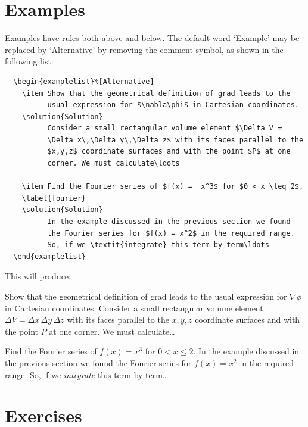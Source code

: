 \section{Examples}
\label{examples}
Examples have rules both above and below. The default word `Example' may be replaced by `Alternative' by removing the comment symbol, as shown in the following list:
\begin{verbatim}
  \begin{examplelist}%[Alternative]
    \item Show that the geometrical definition of grad leads to the
          usual expression for $\nabla\phi$ in Cartesian coordinates.
    \solution{Solution}
          Consider a small rectangular volume element $\Delta V =
          \Delta x\,\Delta y\,\Delta z$ with its faces parallel to the
          $x,y,z$ coordinate surfaces and with the point $P$ at one
          corner. We must calculate\ldots

    \item Find the Fourier series of $f(x) =  x^3$ for $0 < x \leq 2$.
    \label{fourier}
    \solution{Solution}
          In the example discussed in the previous section we found
          the Fourier series for $f(x) = x^2$ in the required range.
          So, if we \textit{integrate} this term by term\ldots
  \end{examplelist}
\end{verbatim}
This will produce:
  \begin{examplelist}%
    \item Show that the geometrical definition of grad leads to the
          usual expression for $\nabla\phi$ in Cartesian coordinates.
          Consider a small rectangular volume element $\Delta V =
          \Delta x\,\Delta y\,\Delta z$ with its faces parallel to the
          $x,y,z$ coordinate surfaces and with the point $P$ at one
          corner. We must calculate\ldots

    \item Find the Fourier series of $f(x) =  x^3$ for $0 < x \leq 2$.
    \label{fourier}
          In the example discussed in the previous section we found
          the Fourier series for $f(x) = x^2$ in the required range.
          So, if we \textit{integrate} this term by term\ldots
  \end{examplelist}


\section{Exercises}

